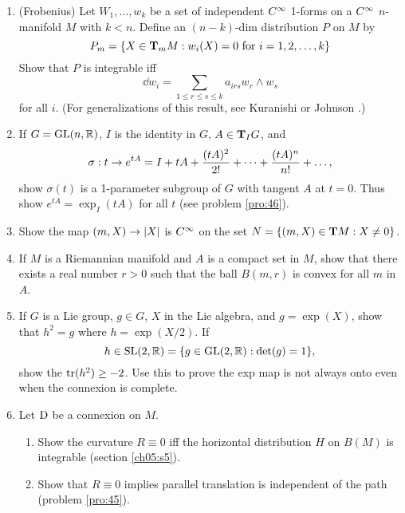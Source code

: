 \documentclass[../main]{subfiles}
\begin{document}
\begin{enumerate}
    \item\label{pro:80}(Frobenius) Let $W_1, \dots, w_k$ be a set of independent $\CInfty$ 1-forms on a $\CInfty$ $n$-manifold $M$ with $k<n$. Define an $(n-k)$-dim distribution $P$ on $M$ by \[P_m = \{X \in \tangentspace{M}{m}: w_i(X) = 0 \text{ for } i=1,2,\dots,k\}\] Show that $P$ is integrable iff \[\dd{w_i} = \sum_{1\le r\le s\le k} a_{irs} w_r \wedge w_s\] for all $i$. (For generalizations of this result, see Kuranishi \cite{kuranishi1957on} or Johnson \cite{johnson1960terminating}.)
    \item\label{pro:81} If $G = \mathrm{GL}(n,\bR)$, $I$ is the identity in $G$, $A\in \tangentspace{G}{I}$, and \[\sigma: t\functionMaps e^{tA} = I + tA + \dfrac{(tA)^2}{2!} + \dots + \dfrac{(tA)^n}{n!} + \dots,\] show $\sigma(t)$ is a 1-parameter subgroup of $G$ with tangent $A$ at $t=0$. Thus show $e^{tA} = \exp_{I} (tA)$ for all $t$ (see problem \ref{pro:46}).
    \item\label{pro:82} Show the map $(m, X)\functionMaps \norm{X}$ is $\CInfty$ on the set \newline $N = \{(m,X) \in \tangentbundle{M}: X\neq 0\}$.
    \item\label{pro:83} If $M$ is a Riemannian manifold and $A$ is a compact set in $M$, show that there exists a real number $r>0$ such that the ball $B(m,r)$ is convex for all $m$ in $A$.
    \item\label{pro:84} If $G$ is a Lie group, $g\in G$, $X$ in the Lie algebra, and $g = \exp(X)$, show that $h^2=g$ where $h = \exp(X/2)$. If \[h\in\mathrm{SL}(2,\bR) = \{g\in \mathrm{GL}(2,\bR):\det(g) = 1\},\] show the $\tr(h^2) \ge -2$. Use this to prove the exp map is not always onto even when the connexion is complete. 
    \item\label{pro:85} Let $\connection$ be a connexion on $M$. 
    \begin{enumerate}[label=(\roman*)]
        \item Show the curvature $R\equiv 0$ iff the horizontal distribution $H$ on $B(M)$ is integrable (section \ref{ch05:s5}).
        \item  Show that $R\equiv 0$ implies parallel translation is independent of the path (problem \ref{pro:45}). 
    \end{enumerate}
    

\end{enumerate}
\end{document}
